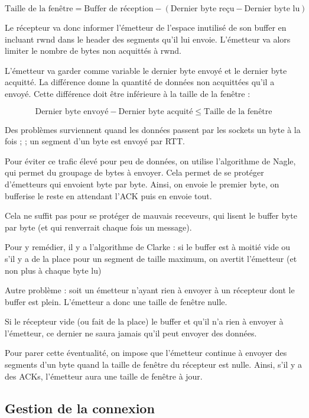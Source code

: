 	$$\text{Taille de la fenêtre} = \text{Buffer de réception} - ( \text{Dernier byte reçu} - \text{Dernier byte lu}) $$
	
	
	Le récepteur va donc informer l'émetteur de l'espace inutilisé de son buffer en incluant rwnd dans le header des segments qu'il lui envoie. L'émetteur va alors limiter le nombre de bytes non acquittés à rwnd.
	
	L'émetteur va garder comme variable le dernier byte envoyé et le dernier byte acquitté. La différence donne la quantité de données non acquittées qu'il a envoyé. Cette différence doit être inférieure à la taille de la fenêtre :
	
	$$\text{Dernier byte envoyé} - \text{Dernier byte acquité} \leq \text{Taille de la fenêtre}$$
			
	
	Des problèmes surviennent quand les données passent par les sockets un byte à la fois ; ; un segment d'un byte est envoyé par RTT.
	
	Pour éviter ce trafic élevé pour peu de données, on utilise l'algorithme de Nagle, qui permet du groupage de bytes à envoyer. Cela permet de se protéger d'émetteurs qui envoient byte par byte. Ainsi, on envoie le premier byte, on bufferise le reste en attendant l'ACK puis en envoie tout.
	
	Cela ne suffit pas pour se protéger de mauvais receveurs, qui lisent le buffer byte par byte (et qui renverrait chaque fois un message).
	
	
	Pour y remédier, il y a l'algorithme de Clarke : si le buffer est à moitié vide ou s'il y a de la place pour un segment de taille maximum, on avertit l'émetteur (et non plus à chaque byte lu)
	
	Autre problème : soit un émetteur n'ayant rien à envoyer à un récepteur dont le buffer est plein. L'émetteur a donc une taille de fenêtre nulle.
	
	Si le récepteur vide (ou fait de la place) le buffer et qu'il n'a rien à envoyer à l'émetteur, ce dernier ne saura jamais qu'il peut envoyer des données.
	
	Pour parer  cette éventualité, on impose que l'émetteur continue à envoyer des segments d'un byte quand la taille de fenêtre du récepteur est nulle. Ainsi, s'il y a des ACKs, l'émetteur aura une taille de fenêtre à jour. 

	\subsection{Gestion de la connexion}
	
